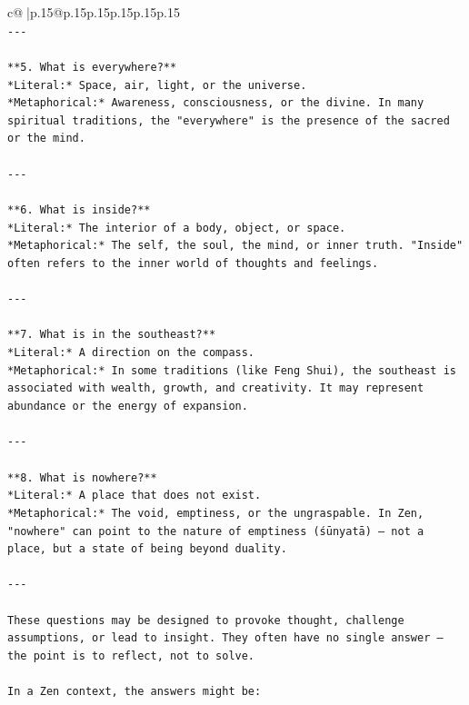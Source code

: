 \documentclass{article}
\begin{document}
{\begin{supertabular}{c@{$\;$}|p{.15\linewidth}@{}p{.15\linewidth}p{.15\linewidth}p{.15\linewidth}p{.15\linewidth}p{.15\linewidth}}
{{{\\ 
\texttt{{-}{-}{-}} \\
\\ 
\texttt{**5. What is everywhere?**  } \\
\texttt{*Literal:* Space, air, light, or the universe.  } \\
\texttt{*Metaphorical:* Awareness, consciousness, or the divine. In many spiritual traditions, the "everywhere" is the presence of the sacred or the mind.} \\
\\ 
\texttt{{-}{-}{-}} \\
\\ 
\texttt{**6. What is inside?**  } \\
\texttt{*Literal:* The interior of a body, object, or space.  } \\
\texttt{*Metaphorical:* The self, the soul, the mind, or inner truth. "Inside" often refers to the inner world of thoughts and feelings.} \\
\\ 
\texttt{{-}{-}{-}} \\
\\ 
\texttt{**7. What is in the southeast?**  } \\
\texttt{*Literal:* A direction on the compass.  } \\
\texttt{*Metaphorical:* In some traditions (like Feng Shui), the southeast is associated with wealth, growth, and creativity. It may represent abundance or the energy of expansion.} \\
\\ 
\texttt{{-}{-}{-}} \\
\\ 
\texttt{**8. What is nowhere?**  } \\
\texttt{*Literal:* A place that does not exist.  } \\
\texttt{*Metaphorical:* The void, emptiness, or the ungraspable. In Zen, "nowhere" can point to the nature of emptiness (śūnyatā) — not a place, but a state of being beyond duality.} \\
\\ 
\texttt{{-}{-}{-}} \\
\\ 
\texttt{These questions may be designed to provoke thought, challenge assumptions, or lead to insight. They often have no single answer — the point is to reflect, not to solve.} \\
\\ 
\texttt{In a Zen context, the answers might be:} \\
}}}
\end{supertabular}}
\end{document}
